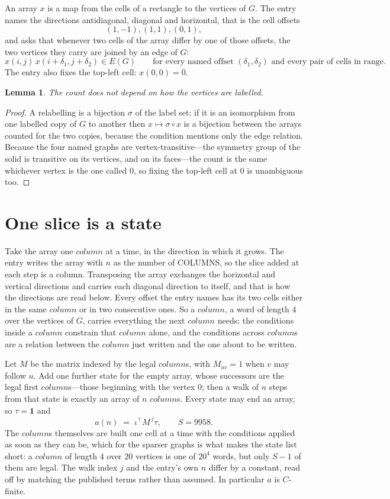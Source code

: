 \documentclass[11pt,a4paper]{article}
\theoremstyle{plain}
\newtheorem{lemma}[theorem]{Lemma}
\theoremstyle{definition}
\begin{document}
An array $x$ is a map from the cells of a rectangle to the vertices of $G$. The entry names the
directions antidiagonal, diagonal and horizontal, that is the cell offsets
\[
(1,-1), (1,1), (0,1),
\]
and asks that whenever two cells of the array differ by one of those offsets, the two vertices
they carry are joined by an edge of $G$:
\[
x(i,j)\,x(i+\delta_1,j+\delta_2)\in E(G)\qquad
\text{for every named offset } (\delta_1,\delta_2)\text{ and every pair of cells in range.}
\]
The entry also fixes the top-left cell: $x(0,0)=0$.

\begin{lemma}\label{lem:label}
The count does not depend on how the vertices are labelled.
\end{lemma}

\begin{proof}
A relabelling is a bijection $\sigma$ of the label set; if it is an isomorphism from one
labelled copy of $G$ to another then $x\mapsto\sigma\circ x$ is a bijection between the arrays
counted for the two copies, because the condition mentions only the edge relation.
Because the four named graphs are vertex-transitive---the symmetry group of the solid is transitive on its vertices, and on its faces---the count is the same whichever vertex is the one called $0$, so fixing the top-left cell at $0$ is unambiguous too.
\end{proof}

\section{One slice is a state}

Take the array one $column$ at a time, in the direction in which it grows. The entry writes the array with $n$ as the number of COLUMNS, so the slice added at each step is a column. Transposing the array exchanges the horizontal and vertical directions and carries each diagonal direction to itself, and that is how the directions are read below.
Every offset the entry names has its two cells either in the same $column$ or in two
consecutive ones. So a $column$, a word of length $4$ over the vertices of $G$, carries
everything the next $column$ needs: the conditions inside a $column$ constrain that
$column$ alone, and the conditions across $column$s are a relation between the
$column$ just written and the one about to be written.

Let $M$ be the matrix indexed by the legal $column$s, with $M_{uv}=1$ when $v$ may
follow $u$. Add one further state for the empty array, whose successors are the legal first
$column$s---those beginning with the vertex $0$; then a walk of
$n$ steps from that state is exactly an array of $n$ $column$s. Every state may end an
array, so $\tau=\mathbf{1}$ and
\[
a(n)\;=\;\iota^{\!\top}M^{\,j}\tau ,\qquad S=9958.
\]
The $column$s themselves are built one cell at a time with the conditions applied as soon
as they can be, which for the sparser graphs is what makes the state list short: a $column$
of length $4$ over $20$ vertices is one of $20^{4}$ words, but only $S-1$ of them are
legal. The walk index $j$ and the entry's own $n$ differ by a constant, read off by matching the
published terms rather than assumed. In particular $a$ is $C$-finite.
\end{document}
